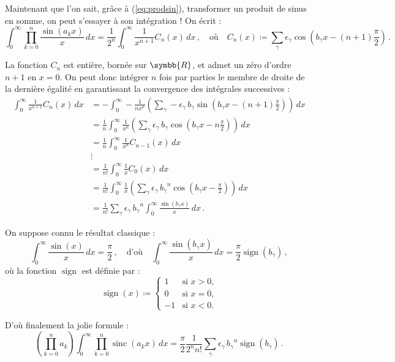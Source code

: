\documentclass[a4paper,11pt]{article}
\newcommand{\R}{\ensuremath{\symbb{R}}\xspace}
\newcommand{\g}{\ensuremath{\gamma}\xspace}
\newcommand{\bg}{\ensuremath{b_{\gamma}}\xspace}
\newcommand{\eg}{\ensuremath{\epsilon_{\gamma}}\xspace}
\DeclareMathOperator{\sinc}{sinc}
\DeclareMathOperator{\sign}{sign}
\begin{document}
Maintenant que l'on sait, grâce à (\ref{eq:prodsin}), transformer un produit
de sinus en somme, on peut s'essayer à son intégration !
On écrit :
\[
  \int_0^\infty\prod_{k=0}^n \frac{\sin(a_k x)}{x}\,dx =
  \frac{1}{2^n}\int_0^\infty \frac{1}{x^{n+1}}C_n(x)\,dx\,,
  \quad\text{où}\quad
  C_n(x) \coloneq \sum_\g \eg\cos\left(\bg x-(n+1)\frac{\pi}{2}\right)\,.
\]

La fonction $C_n$ est entière, bornée sur $\R$, et admet un zéro d'ordre
$n+1$ en $x=0$. On peut donc intégrer $n$ fois par parties le membre
de droite de la dernière égalité en garantissant la convergence des
intégrales successives :
\begin{align*}
  \int_0^\infty \frac{1}{x^{n+1}}C_n(x)\,dx
  &= -\int_0^\infty - \frac{1}{nx^n}
     \left(\sum_\g-\eg\,\bg\sin\left(\bg x-(n+1)\frac{\pi}{2}\right)\right)
     \,dx \\
  &= \frac{1}{n}\int_0^\infty \frac{1}{x^n}
     \left(\sum_\g \eg\,\bg\cos\left(\bg x-n\frac{\pi}{2}\right)\right)
     \,dx \\
  &= \frac{1}{n}\int_0^\infty \frac{1}{x^n} C_{n-1}(x)\,dx \\
  &\vdots \\
  &= \frac{1}{n!}\int_0^\infty \frac{1}{x} C_0(x)\,dx \\
  &= \frac{1}{n!}\int_0^\infty \frac{1}{x}
     \left(\sum_\g \eg\,\bg^n\cos\left(\bg x-\frac{\pi}{2}\right)\right)
     \,dx \\
  &= \frac{1}{n!}\sum_\g \eg\,\bg^n \int_0^\infty \frac{\sin(\bg x)}{x}
     \,dx \,.
\end{align*}

On suppose connu le résultat classique :
\[
  \int_0^\infty \frac{\sin(x)}{x}\,dx = \frac{\pi}{2}\,,
  \quad\text{d'où}\quad
  \int_0^\infty \frac{\sin(\bg x)}{x}\,dx = \frac{\pi}{2}\sign(\bg) \,,
\]
où la fonction $\sign$ est définie par :
\[
  \sign(x) \coloneq
  \begin{cases}
    1  & \text{si $x>0$,} \\
    0  & \text{si $x=0$,} \\
    -1 & \text{si $x<0$.}
  \end{cases}
\]

D'où finalement la jolie formule :
\begin{equation}\label{eq:result}
  \left(\prod_{k=0}^n a_k\right)
  \int_0^\infty \prod_{k=0}^n \sinc(a_k x)\,dx =
  \frac{\pi}{2}\frac{1}{2^n n!}\sum_\g \eg\,\bg^n\sign(\bg) \,.
\end{equation}
\end{document}
